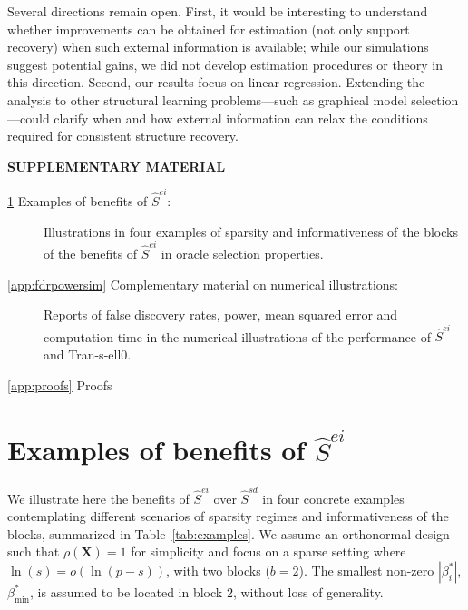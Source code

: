 \documentclass[
  12pt]{article}
\newcommand{\bX}{\mathbf{X}}
\begin{document}
Several directions remain open. 
First, it would be interesting to understand whether improvements can be obtained for estimation (not only support recovery) when such external information is available; while our simulations suggest potential gains, we did not develop estimation procedures or theory in this direction. 
Second, our results focus on linear regression. Extending the analysis to other structural learning problems—such as graphical model selection—could clarify when and how external information can relax the conditions required for consistent structure recovery.



\label{supplementary-material}
\bigskip

\begin{center}

{\large\bf SUPPLEMENTARY MATERIAL}

\end{center}

\renewcommand{\thesection}{S\arabic{section}}
\renewcommand{\theequation}{S\arabic{equation}}
\renewcommand{\thefigure}{S\arabic{figure}}
\renewcommand{\thetable}{S\arabic{table}}


\begin{description}
\item[\ref{app:exbenef} Examples of benefits of $\hat S^{ei}$:]
Illustrations in four examples of sparsity and informativeness of the blocks of the benefits of $\hat S^{ei}$ in oracle selection properties.
\item[\ref{app:fdrpowersim} Complementary material on numerical illustrations:]
Reports of false discovery rates, power, mean squared error and computation time in the numerical illustrations of the performance of $\hat S^{ei}$ and Tran-s-ell0.
\item[\ref{app:proofs} Proofs]
\end{description}

\setcounter{section}{0}
\setcounter{equation}{0}
\setcounter{figure}{0}
\setcounter{table}{0}

\section{Examples of benefits of $\hat S^{ei}$}\label{app:exbenef}

We illustrate here the benefits of $\hat S^{ei}$ over $\hat S^{sd}$ in four concrete examples contemplating different scenarios of sparsity regimes and informativeness of the blocks, summarized in Table~\ref{tab:examples}. We assume an orthonormal design such that $\rho(\bX)=1$ for simplicity and focus on a sparse setting where $\ln(s)=o(\ln(p-s))$, with two blocks ($b=2$). The smallest non-zero $|\beta_i^*|$, $\beta_{\min}^*$, is assumed to be located in block $2$, without loss of generality. 
\end{document}

